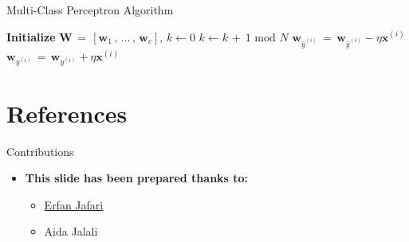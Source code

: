 \documentclass[serif, aspectratio=169]{beamer}
\begin{document}
\begin{frame}{Multi-Class Perceptron Algorithm}

    \begin{algorithm}[H]
    \caption{Multi-class perceptron}\label{alg:Multi-class perceptron}
    \begin{algorithmic}[1]
        \State \textbf{Initialize} $\mathbf{W} \, = \, [\mathbf{w}_1 \, , \, ... \, , \, \mathbf{w}_c], \, k \leftarrow 0$
            \State \(k \leftarrow k \, + \, 1 \text{ mod } N\)
            \State \(\mathbf{w}_{\hat{y}^{(i)}} \, = \, \mathbf{w}_{\hat{y}^{(i)}} - \eta \mathbf{x}^{(i)}\)
            \State \(\mathbf{w}_{y^{(i)}} \, = \, \mathbf{w}_{y^{(i)}} + \eta \mathbf{x}^{(i)}\)
            \EndIf
        \EndWhile
    \end{algorithmic}
    \end{algorithm}
    
\end{frame}


\section{References}


\begin{frame}{Contributions}
\begin{itemize}
\item \textbf{This slide has been prepared thanks to:}
\medskip
\begin{itemize}
    \item \href{https://github.com/jefri021}{Erfan Jafari}
    \item {Aida Jalali}
\end{itemize}
\end{itemize}

\end{frame}


\begin{frame}[allowframebreaks]
    
    
    \nocite{*} %
\end{frame}
\end{document}

